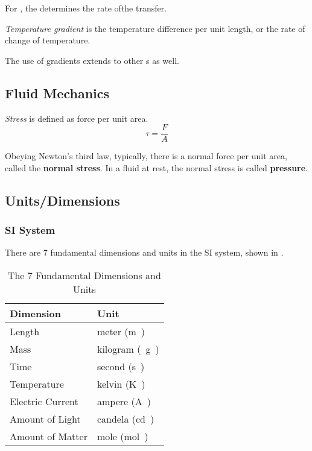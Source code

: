 For , the  determines the rate ofthe transfer.

\begin{definition}\label{def:Temperature_Gradient}
  \emph{Temperature gradient} is the temperature difference per unit length, or the rate of change of temperature.

  \begin{remark}[Extension]
    The use of gradients extends to other s as well.
  \end{remark}
\end{definition}

\subsection{Fluid Mechanics}\label{subsec:Fluid_Mechanics}
\begin{definition}[Stress]\label{def:Stress}
  \emph{Stress} is defined as force per unit area.
  \begin{equation}\label{eq:Stress}
    \tau = \frac{F}{A}
  \end{equation}
\end{definition}

Obeying Newton's third law, typically, there is a normal force per unit area, called the \textbf{normal stress}.
In a fluid at rest, the normal stress is called \textbf{pressure}.

\subsection{Units/Dimensions}\label{subsec:Units_Dimensions}
\subsubsection{SI System}\label{subsubsec:SI_System}
There are 7 fundamental dimensions and units in the SI system, shown in .
\begin{table}[h!tbp]
  \centering
  \begin{tabular}{ll}
    \toprule
    Dimension & Unit \\
    \midrule
    Length & meter (\si{\meter{}}) \\
    Mass & kilogram (\si{\kilo{} \gram{}}) \\
    Time & second (\si{\second{}}) \\
    Temperature & kelvin (\si{\kelvin{}}) \\
    Electric Current & ampere (\si{\ampere{}}) \\
    Amount of Light & candela (\si{\candela{}}) \\
    Amount of Matter & mole (\si{\mole{}}) \\
    \bottomrule
  \end{tabular}
  \caption{The 7 Fundamental Dimensions and Units}
  \label{tab:7_Fundamental_Dimensions}
\end{table}

